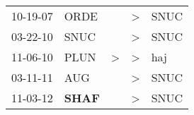 \begin{supertabular}{p{0.07\textwidth}p{0.06\textwidth}p{0.02\textwidth}p{0.02\textwidth}p{0.06\textwidth}}
 10-19-07\textsuperscript{} &           ORDE\textsuperscript{} &               &  \textgreater &  SNUC\textsuperscript{} \\
 03-22-10\textsuperscript{} &           SNUC\textsuperscript{} &               &  \textgreater &  SNUC\textsuperscript{} \\
 11-06-10\textsuperscript{} &           PLUN\textsuperscript{} &  \textgreater &  \textgreater &   haj\textsuperscript{} \\
 03-11-11\textsuperscript{} &            AUG\textsuperscript{} &               &  \textgreater &  SNUC\textsuperscript{} \\
 11-03-12\textsuperscript{} &  \textbf{SHAF\textsuperscript{}} &               &  \textgreater &  SNUC\textsuperscript{} \\
\end{supertabular}
